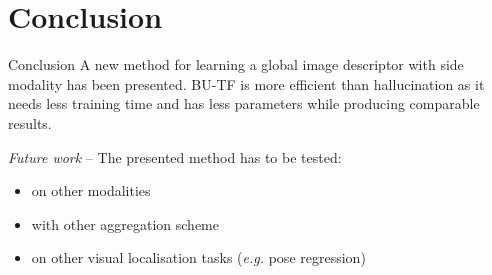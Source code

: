 \section{Conclusion}

\label{subsec:conlusion}

\begin{frame}{Conclusion}
	\vfill
	A new method for learning a global image descriptor with side modality has been presented. BU-TF is more efficient than hallucination as it needs less training time and has less parameters while producing comparable results.
	\vfill
	\uncover<2->
	{


		\textit{Future work} -- The presented method has to be tested:
		\begin{itemize}
			\item<2-> on other modalities
			\item<3-> with other aggregation scheme
			\item<4-> on other visual localisation tasks (\textit{e.g.} pose regression)
		\end{itemize}
	}	
\end{frame}
